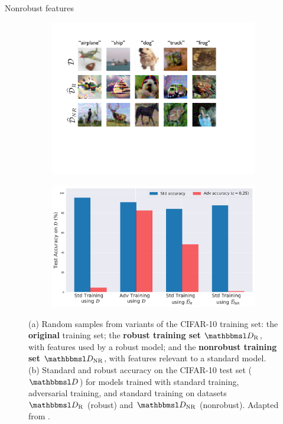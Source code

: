 \documentclass{beamer}
\newcommand{\citet}[1]{{\color{citecolor}\relscale{0.8}\textcite{#1}}}
\begin{document}
\begin{frame}[allowframebreaks=0.9]{Nonrobust features}
\begin{itemize}
	\end{itemize}
	\begin{figure}
		\centering
		\begin{subfigure}[b]{0.49\textwidth}
			\centering
			\includegraphics[width=1.0\textwidth]{figures/adversarial-examples/ilyas/cifar_datasets.pdf}
			\caption{}
			\label{fig:robust_inputs}
		\end{subfigure}
		\hfill
		\begin{subfigure}[b]{0.49\textwidth}
			\centering
			\includegraphics[width=\textwidth]{figures/adversarial-examples/ilyas/CIFAR_res.pdf}
			\caption{}
			\label{fig:robustify_cifar}
		\end{subfigure}
		\caption{
			(a) Random samples from variants of the
			CIFAR-10 training set:
			the \textbf{original} training set; 
			the \textbf{robust training set} $\set D_\text{R}$, with features used by a
			robust model; and
			the \textbf{nonrobust training set} $\set D_\text{NR}$, with
			features relevant to a standard model.
			(b) Standard and robust accuracy on the CIFAR-10
			test set ($\set D$) for models trained with standard training, adversarial training, and standard training on datasets $\set D_\text{R}$ (robust) and $\set D_\text{NR}$ (nonrobust). Adapted from \citet{Ilyas:2019:AENBTF}.}
		\label{fig:iliyas-experiment-results}
	\end{figure}
\end{frame}
\end{document}
